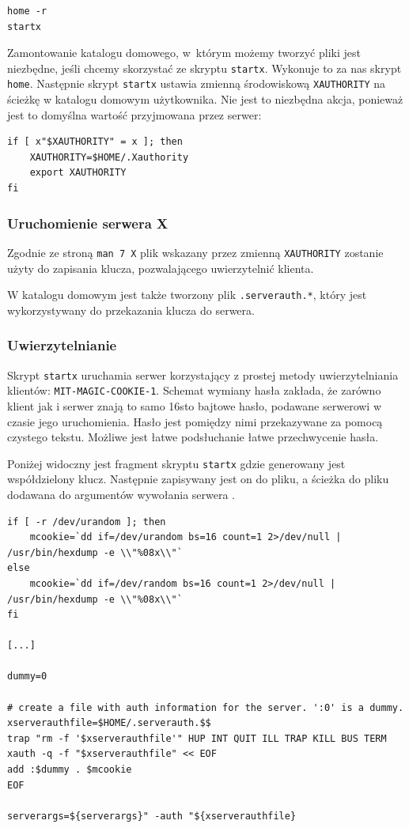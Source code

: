\documentclass[a4paper,11pt]{article}
\begin{document}
\begin{lstlisting}
home -r
startx
\end{lstlisting}

Zamontowanie katalogu domowego, w~którym możemy tworzyć pliki jest niezbędne,
jeśli chcemy skorzystać ze skryptu \texttt{startx}. Wykonuje to za nas skrypt
\texttt{home}. Następnie skrypt \texttt{startx} ustawia zmienną środowiskową
\texttt{XAUTHORITY} na ścieżkę w katalogu domowym użytkownika. Nie jest to
niezbędna akcja, ponieważ jest to domyślna wartość przyjmowana przez serwer:

\begin{lstlisting}
if [ x"$XAUTHORITY" = x ]; then
    XAUTHORITY=$HOME/.Xauthority
    export XAUTHORITY
fi
\end{lstlisting}

\subsubsection{Uruchomienie serwera X}
Zgodnie ze stroną \texttt{man 7 X} plik wskazany przez zmienną
\texttt{XAUTHORITY} zostanie użyty do zapisania klucza, pozwalającego
uwierzytelnić klienta.

W katalogu domowym jest także tworzony plik \texttt{.serverauth.*}, który jest
wykorzystywany do przekazania klucza do serwera.

\subsubsection{Uwierzytelnianie}
Skrypt \texttt{startx} uruchamia serwer \xbin{} korzystający z prostej metody
uwierzytelniania klientów: \texttt{MIT-MAGIC-COOKIE-1}.  Schemat wymiany hasła
zakłada, że zarówno klient jak i serwer znają to samo 16\dywiz sto bajtowe
hasło, podawane serwerowi w czasie jego uruchomienia. Hasło jest pomiędzy nimi
przekazywane za pomocą czystego tekstu. Możliwe jest łatwe podsłuchanie łatwe
przechwycenie hasła.

Poniżej widoczny jest fragment skryptu \texttt{startx} gdzie generowany jest
współdzielony klucz. Następnie zapisywany jest on do pliku, a ścieżka do pliku
dodawana do argumentów wywołania serwera \xbin.

\begin{lstlisting}
if [ -r /dev/urandom ]; then
    mcookie=`dd if=/dev/urandom bs=16 count=1 2>/dev/null | /usr/bin/hexdump -e \\"%08x\\"`
else
    mcookie=`dd if=/dev/random bs=16 count=1 2>/dev/null | /usr/bin/hexdump -e \\"%08x\\"`
fi

[...]

dummy=0

# create a file with auth information for the server. ':0' is a dummy.
xserverauthfile=$HOME/.serverauth.$$
trap "rm -f '$xserverauthfile'" HUP INT QUIT ILL TRAP KILL BUS TERM
xauth -q -f "$xserverauthfile" << EOF
add :$dummy . $mcookie
EOF

serverargs=${serverargs}" -auth "${xserverauthfile}
\end{lstlisting}
\end{document}
